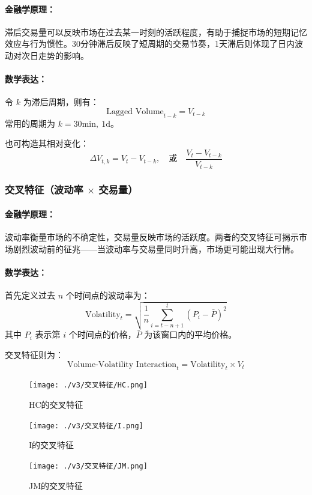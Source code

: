 \documentclass[a4paper,11pt]{ctexart}
\begin{document}
\paragraph{金融学原理：}

滞后交易量可以反映市场在过去某一时刻的活跃程度，有助于捕捉市场的短期记忆效应与行为惯性。30分钟滞后反映了短周期的交易节奏，1天滞后则体现了日内波动对次日走势的影响。

\paragraph{数学表达：}

令 $k$ 为滞后周期，则有：
\[
\text{Lagged Volume}_{t-k} = V_{t-k}
\]
常用的周期为 $k = 30\text{min},\ 1\text{d}$。

也可构造其相对变化：
\[
\Delta V_{t,k} = V_t - V_{t-k}, \quad \text{或} \quad \frac{V_t - V_{t-k}}{V_{t-k}}
\]

\subsubsection{交叉特征（波动率 $\times$ 交易量）}

\paragraph{金融学原理：}

波动率衡量市场的不确定性，交易量反映市场的活跃度。两者的交叉特征可揭示市场剧烈波动前的征兆——当波动率与交易量同时升高，市场更可能出现大行情。

\paragraph{数学表达：}

首先定义过去 $n$ 个时间点的波动率为：
\[
\text{Volatility}_t = \sqrt{\frac{1}{n} \sum_{i=t-n+1}^{t} (P_i - \bar{P})^2}
\]
其中 $P_i$ 表示第 $i$ 个时间点的价格，$\bar{P}$ 为该窗口内的平均价格。

交叉特征则为：
\[
\text{Volume-Volatility Interaction}_t = \text{Volatility}_t \times V_t
\]
\FloatBarrier
\noindent
  \begin{figure}[H]
  \centering

    \texttt{[image: ./v3/交叉特征/HC.png]}
    \caption*{HC的交叉特征}
  \end{figure}
  \begin{figure}[H]
    \centering
    \texttt{[image: ./v3/交叉特征/I.png]}
    \caption*{I的交叉特征}
  \end{figure}
  \begin{figure}[H]
    \centering
    \texttt{[image: ./v3/交叉特征/JM.png]}
    \caption*{JM的交叉特征}
 
  \end{figure}
\end{document}
